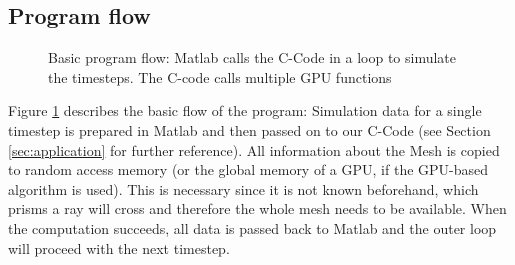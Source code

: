 \subsection{Program flow}
\label{subsec:program_flow}
\begin{figure}[H]
  \centerline
  {}
  \caption{Basic program flow: Matlab calls the C-Code in a loop to
  simulate the timesteps. The C-code calls multiple GPU functions}
  \label{graphic:pap1}
\end{figure}

Figure \ref{graphic:pap1} describes the basic flow of the program: Simulation
data for a single timestep is prepared in Matlab and then passed on to our
C-Code (see Section \ref{sec:application} for further reference). All information about
the Mesh is copied to random access memory (or the global memory of a GPU, if
the GPU-based algorithm is used). This is necessary since it is not known
beforehand, which prisms a ray will cross and therefore the whole mesh needs to
be available. When the computation succeeds, all data is passed back to Matlab
and the outer loop will proceed with the next timestep. 


